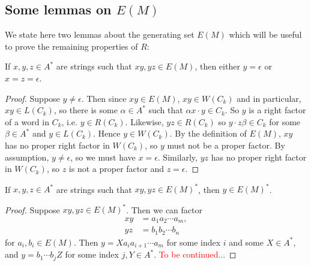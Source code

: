 \documentclass[nosubthm]{lmaths}
\begin{document}

\subsection{Some lemmas on $E(M)$}

We state here two lemmas about the generating set $E(M)$ which will be useful to prove the remaining properties of $R$:

\begin{lemma} \label{lma:no-middle-E(M)}
	If $x, y, z \in A^*$ are strings such that $xy, yz \in E(M)$, then either $y = \epsilon$ or $x = z = \epsilon$.
\end{lemma}
\begin{proof}
	Suppose $y \ne \epsilon$. Then since $xy \in E(M)$, $xy \in W(C_k)$ and in particular, $xy \in L(C_k)$, so there is some $\alpha \in A^*$ such that $\alpha x \cdot y \in C_k$. So $y$ is a right factor of a word in $C_k$, i.e. $y \in R(C_k)$. Likewise, $yz \in R(C_k)$ so $y \cdot z\beta \in C_k$ for some $\beta \in A^*$ and $y \in L(C_k)$. Hence $y \in W(C_k)$. By the definition of $E(M)$, $xy$ has no proper right factor in $W(C_k)$, so $y$ must not be a proper factor. By assumption, $y \ne \epsilon$, so we must have $x = \epsilon$. Similarly, $yz$ has no proper right factor in $W(C_k)$, so $z$ is not a proper factor and $z = \epsilon$.
\end{proof}

\begin{cly} \label{cly:middle-E(M)*}
	If $x, y, z \in A^*$ are strings such that $xy, yz \in E(M)^*$, then $y \in E(M)^*$.
\end{cly}
\begin{proof}
	Suppose $xy, yz \in E(M)^*$. Then we can factor
		\begin{align*}
			xy &= a_1 a_2 \cdots a_m, \\
			yz &= b_1 b_2 \cdots b_n
		\end{align*}
	for $a_i, b_i \in E(M)$. Then $y = X a_i a_{i+1} \cdots a_m$ for some index $i$ and some $X \in A^*$, and $y = b_1 \cdots b_j Z$ for some index $j, Y \in A^*$. \textcolor{red}{To be continued...}
\end{proof}
\end{document}
